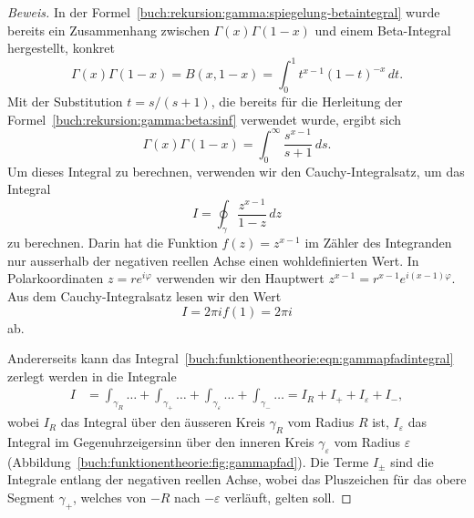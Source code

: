 \begin{proof}[Beweis]
In der Formel~\eqref{buch:rekursion:gamma:spiegelung-betaintegral}
wurde bereits ein Zusammenhang zwischen $\Gamma(x)\Gamma(1-x)$
und einem Beta-Integral hergestellt, konkret
\[
\Gamma(x)\Gamma(1-x)
=
B(x,1-x)
=
\int_0^1 t^{x-1}(1-t)^{-x}\,dt.
\]
Mit der Substitution $t=s/(s+1)$, die bereits für die Herleitung der
Formel~\eqref{buch:rekursion:gamma:beta:sinf} verwendet wurde, ergibt sich
\[
\Gamma(x)\Gamma(1-x)
=
\int_0^\infty 
\frac{s^{x-1}}{s+1}
\,ds.
\]
Um dieses Integral zu berechnen, verwenden wir den Cauchy-Integralsatz,
um das Integral
\begin{equation}
I
=
\oint_\gamma \frac{z^{x-1}}{1-z}\,dz
\label{buch:funktionentheorie:eqn:gammapfadintegral}
\end{equation}
zu berechnen.
Darin hat die Funktion $f(z)=z^{x-1}$ im Zähler des Integranden
nur ausserhalb der negativen reellen Achse einen wohldefinierten Wert.
In Polarkoordinaten $z=re^{i\varphi}$ verwenden wir
den Hauptwert $z^{x-1}=r^{x-1}e^{i(x-1)\varphi}$.
Aus dem Cauchy-Integralsatz lesen wir den Wert
\[
I
=
2\pi i f(1)
=
2\pi i
\]
ab.

Andererseits kann das Integral~\eqref{buch:funktionentheorie:eqn:gammapfadintegral}
zerlegt werden in die Integrale
\begin{align*}
I
&=
\int_{\gamma_R} \dots 
+
\int_{\gamma_+} \dots
+
\int_{\gamma_\varepsilon}\dots
+
\int_{\gamma_-} \dots
=
I_R+I_++I_\varepsilon+I_-,
\end{align*}
wobei $I_R$ das Integral über den äusseren Kreis $\gamma_R$ vom Radius $R$
ist,
$I_\varepsilon$ das Integral im Gegenuhrzeigersinn über den inneren Kreis
$\gamma_\varepsilon$
vom Radius $\varepsilon$ (Abbildung~\ref{buch:funktionentheorie:fig:gammapfad}).
Die Terme $I_{\pm}$ sind die Integrale entlang der negativen
reellen Achse, wobei das Pluszeichen für das obere Segment $\gamma_+$,
welches von $-R$ nach $-\varepsilon$ verläuft, gelten soll.


\end{proof}
